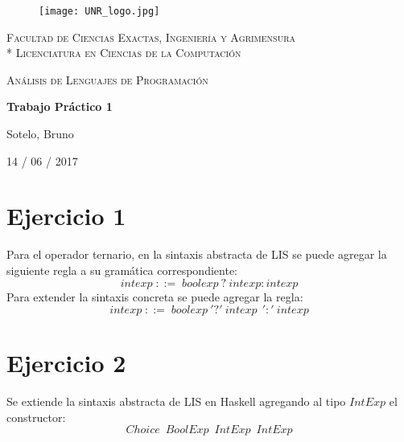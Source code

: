 \documentclass[12pt,a4paper]{article}
\begin{document}
\begin{titlepage}
\centering
\begin{figure}[H]
    \begin{center}
        \texttt{[image: UNR\_logo.jpg]}
    \end{center}
\end{figure}
{\scshape\large Facultad de Ciencias Exactas, Ingenier\'ia y Agrimensura\\*
                 Licenciatura en Ciencias de la Computaci\'on\par}
\vspace{3cm}
{\scshape\LARGE An\'alisis de Lenguajes de Programaci\'on\par}
{\huge\bfseries Trabajo Pr\'actico 1\par}
\vspace{3cm}
{\Large Sotelo, Bruno\par}
\vfill
{\large 14 / 06 / 2017 \par}
\end{titlepage}

\section*{Ejercicio 1}
Para el operador ternario, en la sintaxis abstracta de LIS se puede
agregar la siguiente regla a su gram\'atica correspondiente:
$$ intexp\;::=\;boolexp\:?\:intexp:intexp $$
Para extender la sintaxis concreta se puede agregar la regla:
$$ intexp\;::=\;boolexp\:'?'\:intexp\:\:':'\:intexp $$

\section*{Ejercicio 2}
Se extiende la sintaxis abstracta de LIS en Haskell agregando al
tipo $IntExp$ el constructor:
$$ Choice\;\:BoolExp\;\:IntExp\;\:IntExp $$
\end{document}
